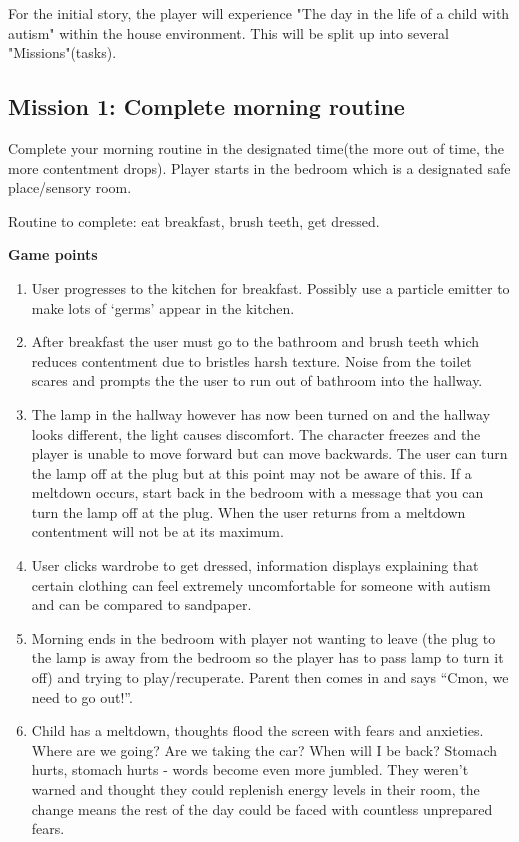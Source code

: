 \documentclass[11pt]{report}
\begin{document}
For the initial story, the player will experience "The day in the life of a child with autism" within the house environment. This will be split up into several "Missions"(tasks).

\subsection*{Mission 1: Complete morning routine}
Complete your morning routine in the designated time(the more out of time, the more contentment drops). Player starts in the bedroom which is a designated safe place/sensory room. 

Routine to complete: eat breakfast, brush teeth, get dressed.

\textbf{Game points}
\begin{enumerate}
\item User progresses to the kitchen for breakfast. Possibly use a particle emitter to make lots of ‘germs’ appear in the kitchen.
\item After breakfast the user must go to the bathroom and brush teeth which reduces contentment due to bristles harsh texture. Noise from the toilet scares and prompts the the user to run out of bathroom into the hallway.
\item The lamp in the hallway however has now been turned on and the hallway looks different, the light causes discomfort. The character freezes and the player is unable to move forward but can move backwards. The user can turn the lamp off at the plug but at this point may not be aware of this. If a meltdown occurs, start back in the bedroom with a message that you can turn the lamp off at the plug. When the user returns from a meltdown contentment will not be at its maximum.
\item User clicks wardrobe to get dressed, information displays explaining that certain clothing can feel extremely uncomfortable for someone with autism and can be compared to sandpaper.
\item Morning ends in the bedroom with player not wanting to leave (the plug to the lamp is away from the bedroom so the player has to pass lamp to turn it off) and trying to play/recuperate. Parent then comes in and says “Cmon, we need to go out!”.
\item Child has a meltdown, thoughts flood the screen with fears and anxieties. Where are we going? Are we taking the car? When will I be back? Stomach hurts, stomach hurts - words become even more jumbled. They weren't warned and thought they could replenish energy levels in their room, the change means the rest of the day could be faced with countless unprepared fears.
\end{enumerate}
\end{document}
